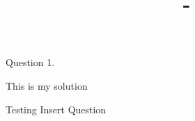\documentclass[answers,12pt,addpoints]{exam}
\author{\name}
\title{\course \ - \assignment}
\begin{document}
\maketitle

\newpage
\begin{questions}
\question Question 1.
\begin{solution}
This is my solution
\end{solution}
Testing
\question Insert Question
\end{questions}
\end{document}
